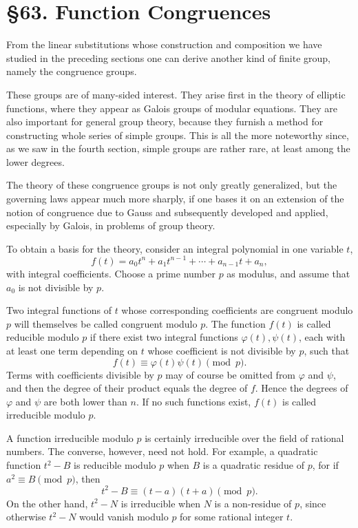 \documentclass[11pt,a4paper]{book}
\newcommand{\webersection}[2]{\clearpage\section*{\S #1. #2}}
\begin{document}
\webersection{63}{Function Congruences}

From the linear substitutions whose construction and composition we have studied in the preceding sections one can derive another kind of finite group, namely the congruence groups.

These groups are of many-sided interest.  They arise first in the theory of elliptic functions, where they appear as Galois groups of modular equations.  They are also important for general group theory, because they furnish a method for constructing whole series of simple groups.  This is all the more noteworthy since, as we saw in the fourth section, simple groups are rather rare, at least among the lower degrees.

The theory of these congruence groups is not only greatly generalized, but the governing laws appear much more sharply, if one bases it on an extension of the notion of congruence due to Gauss and subsequently developed and applied, especially by Galois, in problems of group theory.

To obtain a basis for the theory, consider an integral polynomial in one variable \(t\),
\begin{equation}\label{eq:63-1}
 f(t)=a_0t^n+a_1t^{n-1}+\cdots+a_{n-1}t+a_n,
\end{equation}
with integral coefficients.  Choose a prime number \(p\) as modulus, and assume that \(a_0\) is not divisible by \(p\).

Two integral functions of \(t\) whose corresponding coefficients are congruent modulo \(p\) will themselves be called congruent modulo \(p\).  The function \(f(t)\) is called reducible modulo \(p\) if there exist two integral functions \(\varphi(t),\psi(t)\), each with at least one term depending on \(t\) whose coefficient is not divisible by \(p\), such that
\begin{equation}\label{eq:63-2}
 f(t)\equiv \varphi(t)\psi(t)\pmod p.
\end{equation}
Terms with coefficients divisible by \(p\) may of course be omitted from \(\varphi\) and \(\psi\), and then the degree of their product equals the degree of \(f\).  Hence the degrees of \(\varphi\) and \(\psi\) are both lower than \(n\).  If no such functions exist, \(f(t)\) is called irreducible modulo \(p\).

A function irreducible modulo \(p\) is certainly irreducible over the field of rational numbers.  The converse, however, need not hold.  For example, a quadratic function \(t^2-B\) is reducible modulo \(p\) when \(B\) is a quadratic residue of \(p\), for if \(a^2\equiv B\pmod p\), then
\[
 t^2-B\equiv (t-a)(t+a)\pmod p.
\]
On the other hand, \(t^2-N\) is irreducible when \(N\) is a non-residue of \(p\), since otherwise \(t^2-N\) would vanish modulo \(p\) for some rational integer \(t\).
\end{document}
